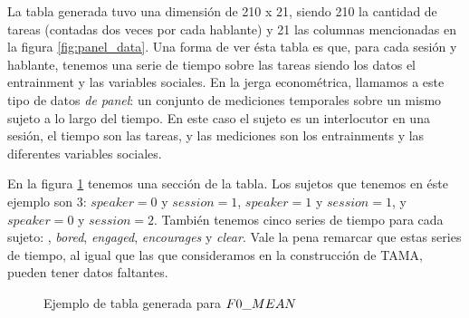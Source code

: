 La tabla generada tuvo una dimensión de 210 x 21, siendo 210 la cantidad de tareas (contadas dos veces por cada hablante) y 21 las columnas mencionadas en la figura \ref{fig:panel_data}. Una forma de ver ésta tabla es que, para cada sesión y hablante, tenemos una serie de tiempo sobre las tareas   siendo los datos el entrainment y las variables sociales. En la jerga econométrica, llamamos a este tipo de datos \emph{de panel}\cite{gujarati1999}: un conjunto de mediciones temporales sobre un mismo sujeto a lo largo del tiempo. En este caso el sujeto es un interlocutor en una sesión, el tiempo son las tareas, y las mediciones son los entrainments y las diferentes variables sociales.

En la figura \ref{fig:panel_data_example} tenemos una sección de la tabla. Los sujetos que tenemos en éste ejemplo son 3: $speaker = 0$ y $session=1$, $speaker = 1$ y $session=1$, y $speaker = 0$ y $session=2$. También tenemos cinco series de tiempo para cada sujeto: \entrainment, \emph{bored}, \emph{engaged}, \emph{encourages} y \emph{clear}. Vale la pena remarcar que estas series de tiempo, al igual que las que consideramos en la construcción de TAMA, pueden tener datos faltantes.


\begin{figure}
\centering

\caption{Ejemplo de tabla generada para $F0\_MEAN$}
\label{fig:panel_data_example}
\end{figure}
